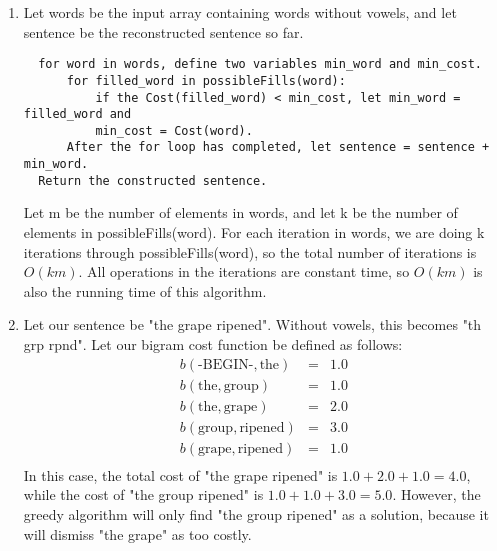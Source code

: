 \documentclass[12pt]{article}
\begin{document}
\begin{enumerate}[label=(\alph*)]
  \item Let words be the input array containing words without vowels, and let sentence be the reconstructed sentence so far.\\
  \begin{verbatim}
  for word in words, define two variables min_word and min_cost.
  	  for filled_word in possibleFills(word):
  	      if the Cost(filled_word) < min_cost, let min_word = filled_word and 
  	      min_cost = Cost(word).
  	  After the for loop has completed, let sentence = sentence + min_word.
  Return the constructed sentence.
  \end{verbatim}
  Let m be the number of elements in words, and let k be the number of elements in possibleFills(word). For each iteration in words, we are doing k iterations through possibleFills(word), so the total number of iterations is $O(km)$. All operations in the iterations are constant time, so $O(km)$ is also the running time of this algorithm.
  \item Let our sentence be "the grape ripened". Without vowels, this becomes "th grp rpnd". Let our bigram cost function be defined as follows:
  \begin{eqnarray*}
  b(\text{-BEGIN-}, \text{the}) &=& 1.0\\
  b(\text{the}, \text{group}) &=& 1.0\\
  b(\text{the}, \text{grape}) &=& 2.0\\
  b(\text{group}, \text{ripened}) &=& 3.0\\
  b(\text{grape}, \text{ripened}) &=& 1.0\\
  \end{eqnarray*}
  In this case, the total cost of "the grape ripened" is $1.0 + 2.0 + 1.0 = 4.0$, while the cost of "the group ripened" is $1.0 + 1.0 + 3.0 = 5.0$. However, the greedy algorithm will only find "the group ripened" as a solution, because it will dismiss "the grape" as too costly.
\end{enumerate}
\end{document}
